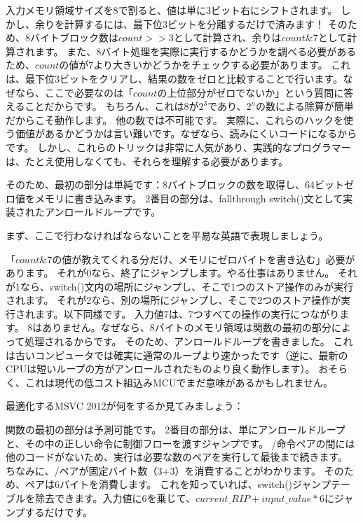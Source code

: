 入力メモリ領域サイズを8で割ると、値は単に3ビット右にシフトされます。
しかし、余りを計算するには、最下位3ビットを分離するだけで済みます！
そのため、8バイトブロック数は$count>>3$として計算され、余りは$count \& 7$として計算されます。
また、8バイト処理を実際に実行するかどうかを調べる必要があるため、$count$の値が7より大きいかどうかをチェックする必要があります。
これは、最下位3ビットをクリアし、結果の数をゼロと比較することで行います。なぜなら、ここで必要なのは「$count$の上位部分がゼロでないか」という質問に答えることだからです。
もちろん、これは8が$2^{3}$であり、$2^n$の数による除算が簡単だからこそ動作します。
他の数では不可能です。
実際に、これらのハックを使う価値があるかどうかは言い難いです。なぜなら、読みにくいコードになるからです。
しかし、これらのトリックは非常に人気があり、実践的なプログラマーは、たとえ使用しなくても、それらを理解する必要があります。

そのため、最初の部分は単純です：8バイトブロックの数を取得し、64ビットゼロ値をメモリに書き込みます。
2番目の部分は、fallthrough switch()文として実装されたアンロールドループです。

まず、ここで行わなければならないことを平易な英語で表現しましょう。

「$count\&7$の値が教えてくれる分だけ、メモリにゼロバイトを書き込む」必要があります。
それが0なら、終了にジャンプします。やる仕事はありません。
それが1なら、switch()文内の場所にジャンプし、そこで1つのストア操作のみが実行されます。
それが2なら、別の場所にジャンプし、そこで2つのストア操作が実行されます。以下同様です。
入力値7は、7つすべての操作の実行につながります。
8はありません。なぜなら、8バイトのメモリ領域は関数の最初の部分によって処理されるからです。
そのため、アンロールドループを書きました。
これは古いコンピュータでは確実に通常のループより速かったです（逆に、最新の\ac{CPU}は短いループの方がアンロールされたものより良く動作します）。
おそらく、これは現代の低コスト組込み\ac{MCU}でまだ意味があるかもしれません。

最適化するMSVC 2012が何をするか見てみましょう：



関数の最初の部分は予測可能です。
2番目の部分は、単にアンロールドループと、その中の正しい命令に制御フローを渡すジャンプです。
/命令ペアの間には他のコードがないため、実行は必要な数のペアを実行して最後まで続きます。
ちなみに、/ペアが固定バイト数（3+3）を消費することがわかります。
そのため、ペアは6バイトを消費します。
これを知っていれば、switch()ジャンプテーブルを除去できます。入力値に6を乗じて、$current\_RIP + input\_value * 6$にジャンプするだけです。

